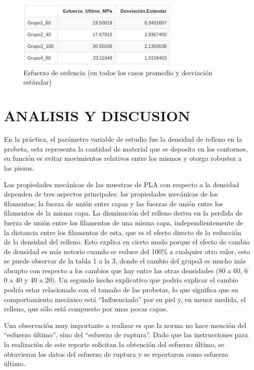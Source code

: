 \documentclass[journal,transmag]{IEEEtran}
\begin{document}
	\begin{figure}[!h]
		\center
		\includegraphics[width=8cm]{imagenes/ultimo.png}
		\caption{Esfuerzo de cedencia (en todos los casos promedio y desviación estándar) }
		\label{1}
	\end{figure}
		
		

\section{ANALISIS Y DISCUSION}

En la práctica, el parámetro variable de estudio fue la densidad de relleno en la probeta, esta representa la cantidad de material que se deposita en los contornos, su función es evitar movimientos relativos entre los mismos y otorga robustez a las piezas. 

Las propiedades mecánicas de las muestras de PLA con respecto a la densidad dependen de tres aspectos principales: las propiedades mecánicas de los filamentos; la fuerza de unión entre capas y las fuerzas de unión entre los filamentos de la misma capa. La disminución del relleno deriva en la perdida de fuerza de unión entre los filamentos de una misma capa, independientemente de la distancia entre los filamentos de esta, que es el efecto directo de la reducción de la densidad del relleno. Esto explica en cierto modo porque el efecto de cambio de densidad es más notorio cuando se reduce del 100\% a cualquier otro valor, esto se puede observar de la tabla 1 a la 3, donde el cambio del grupo3 es mucho más abrupto con respecto a los cambios que hay entre las otras densidades (80 a 60, 6 0 a 40 y 40 a 20). Un segundo hecho explicativo que podría explicar el cambio podría estar relacionado con el tamaño de las probetas, lo que significa que su comportamiento mecánico está “Influenciado” por su piel y, en menor medida, el relleno, que sólo está compuesto por unas pocas capas. 

Una observación muy importante a realizar es que la norma no hace mención del “esfuerzo último”, sino del “esfuerzo de ruptura”. Dado que las instrucciones para la realización de este reporte solicitan la obtención del esfuerzo último, se obtuvieron los datos del esfuerzo de ruptura y se reportaron como esfuerzo último. 
	
\end{document}
